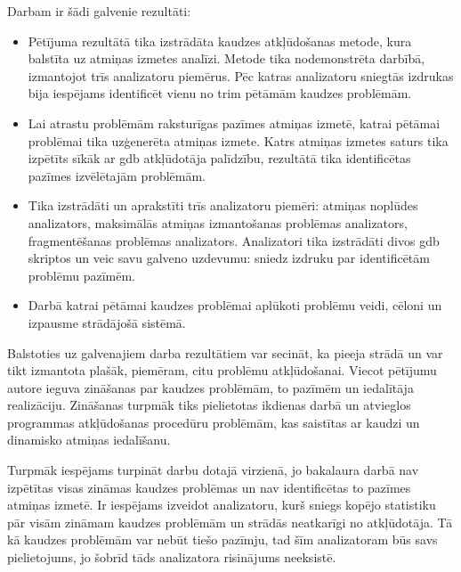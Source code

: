 ﻿Darbam ir šādi galvenie rezultāti:
\begin{itemize}
    \item Pētījuma rezultātā tika izstrādāta kaudzes atkļūdošanas metode, kura balstīta uz atmiņas izmetes analīzi.
    Metode tika nodemonstrēta darbībā, izmantojot trīs analizatoru piemērus.
    Pēc katras analizatoru sniegtās izdrukas bija iespējams identificēt vienu no trim pētāmām kaudzes problēmām.
    \item Lai atrastu problēmām raksturīgas pazīmes atmiņas izmetē, katrai pētāmai problēmai tika uzģenerēta atmiņas izmete.
    Katrs atmiņas izmetes saturs tika izpētīts sīkāk ar gdb atkļūdotāja palīdzību, rezultātā tika identificētas pazīmes izvēlētajām problēmām.
    \item Tika izstrādāti un aprakstīti trīs analizatoru piemēri: atmiņas noplūdes analizators, maksimālās atmiņas izmantošanas problēmas analizators, fragmentēšanas problēmas analizators.
    Analizatori tika izstrādāti divos gdb skriptos un veic savu galveno uzdevumu: sniedz izdruku par identificētām problēmu pazīmēm. 
    \item Darbā katrai pētāmai kaudzes problēmai aplūkoti problēmu veidi, cēloni un izpausme strādājošā sistēmā.
\end{itemize}

Balstoties uz galvenajiem darba rezultātiem var secināt, ka pieeja strādā un var tikt izmantota plašāk, piemēram, citu problēmu atkļūdošanai.
Viecot pētījumu autore ieguva zināšanas par kaudzes problēmām, to pazīmēm un iedalītāja realizāciju.
Zināšanas turpmāk tiks pielietotas ikdienas darbā un atvieglos programmas atkļūdošanas procedūru problēmām, kas saistītas ar kaudzi un dinamisko atmiņas iedalīšanu. 

Turpmāk iespējams turpināt darbu dotajā virzienā, jo bakalaura darbā nav izpētītas visas zināmas kaudzes problēmas un nav identificētas to pazīmes atmiņas izmetē.
Ir iespējams izveidot analizatoru, kurš sniegs kopējo statistiku pār visām zināmam kaudzes problēmām un strādās neatkarīgi no atkļūdotāja. 
Tā kā kaudzes problēmām var nebūt tiešo pazīmju, tad šīm analizatoram būs savs pielietojums, jo šobrīd tāds analizatora risinājums neeksistē.
